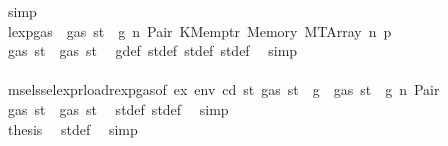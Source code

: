 \begin{isabellebody}
\ simp\isanewline
\ \ \ \ \ \ \ \ \ \ \ \ \ \ \ \ \ \ \ \ \ \ \ \ \ \ \ \ \ \ \isamarkupfalse%
\ \isamarkupfalse%
\ lexp{\isacharunderscore}{\kern0pt}gas\ {\isacharbackquoteopen}{\isasymnot}\ gas\ st\ {\isasymle}\ g{\isacharbackquoteclose}\ n\ Pair\ KMemptr\ Memory\ MTArray\ n{}\ p{}\ \isamarkupfalse%
\ {\isachardoublequoteopen}gas\ st{\isacharprime}{\kern0pt}{\isacharprime}{\kern0pt}{\isacharprime}{\kern0pt}\ {\isasymle}\ gas\ st{\isacharprime}{\kern0pt}{\isacharprime}{\kern0pt}{\isachardoublequoteclose}\ \isamarkupfalse%
\ g{\isacharunderscore}{\kern0pt}def\ st{\isacharprime}{\kern0pt}{\isacharunderscore}{\kern0pt}def\ st{\isacharprime}{\kern0pt}{\isacharprime}{\kern0pt}{\isacharunderscore}{\kern0pt}def\ st{\isacharprime}{\kern0pt}{\isacharprime}{\kern0pt}{\isacharprime}{\kern0pt}{\isacharunderscore}{\kern0pt}def\ \isamarkupfalse%
\ simp\isanewline
\ \ \ \ \ \ \ \ \ \ \ \ \ \ \ \ \ \ \ \ \ \ \ \ \ \ \ \ \ \ \isamarkupfalse%
\ \isamarkupfalse%
\ msel{\isacharunderscore}{\kern0pt}ssel{\isacharunderscore}{\kern0pt}expr{\isacharunderscore}{\kern0pt}load{\isacharunderscore}{\kern0pt}rexp{\isacharunderscore}{\kern0pt}gas{\isacharparenleft}{\kern0pt}{}{\isacharparenright}{\kern0pt}{\isacharbrackleft}{\kern0pt}of\ ex\ env\ cd\ st{\isacharprime}{\kern0pt}\ {\isachardoublequoteopen}gas\ st\ {\isacharminus}{\kern0pt}\ g{\isachardoublequoteclose}{\isacharbrackright}{\kern0pt}\ {\isacharbackquoteopen}{\isasymnot}\ gas\ st\ {\isasymle}\ g{\isacharbackquoteclose}\ n\ Pair\ \isamarkupfalse%
\ {\isachardoublequoteopen}gas\ st{\isacharprime}{\kern0pt}{\isacharprime}{\kern0pt}\ {\isasymle}\ gas\ st{\isacharprime}{\kern0pt}{\isachardoublequoteclose}\ \isamarkupfalse%
\ st{\isacharprime}{\kern0pt}{\isacharunderscore}{\kern0pt}def\ st{\isacharprime}{\kern0pt}{\isacharprime}{\kern0pt}{\isacharunderscore}{\kern0pt}def\ \isamarkupfalse%
\ simp\isanewline
\ \ \ \ \ \ \ \ \ \ \ \ \ \ \ \ \ \ \ \ \ \ \ \ \ \ \ \ \ \ \isamarkupfalse%
\ \isamarkupfalse%
\ {\isacharquery}{\kern0pt}thesis\ \isamarkupfalse%
\ st{\isacharprime}{\kern0pt}{\isacharunderscore}{\kern0pt}def\ \isamarkupfalse%
\ simp\isanewline
\ \ \ \ \ \ \ \ \ \ \ \ \ \ \ \ \ \ \ \ \ \ \ \ \ \ \ \ \isamarkupfalse%
\isanewline
\ \ \ \ \ \ \ \ \ \ \ \ \ \ \ \ \ \ \ \ \ \ \ \ \ \ \isamarkupfalse%
\isanewline
\ \ \ \ \ \ \ \ \ \ \ \ \ \ \ \ \ \ \ \ \ \ \ \ \isamarkupfalse%

\end{isabellebody}
